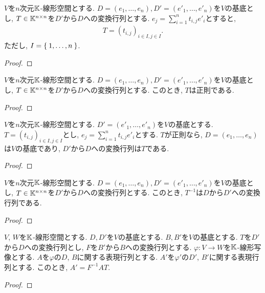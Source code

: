 \begin{prop}
  $V$を$n$次元$\mathbb{K}$-線形空間とする.
  $D=(e_1,\ldots, e_n),D'=(e'_1,\ldots, e'_n)$を$V$の基底とし,
  $T\in\mathbb{K}^{n\times n}$を$D'$から$D$への変換行列とする.
  $e_j=\sum_{i=1}^n t_{i,j}e'_i$とすると,
  \begin{align*}
    T=(t_{i,j})_{i\in I, j\in I}.
  \end{align*}
  ただし, $I=\Set{1,\ldots, n} $.
\end{prop}
\begin{proof}\end{proof}

\begin{prop}
  $V$を$n$次元$\mathbb{K}$-線形空間とする.
  $D=(e_1,\ldots, e_n),D'=(e'_1,\ldots, e'_n)$を$V$の基底とし,
  $T\in\mathbb{K}^{n\times n}$を$D'$から$D$への変換行列とする.
  このとき, $T$は正則である.
\end{prop}
\begin{proof}\end{proof}

\begin{prop}
  $V$を$n$次元$\mathbb{K}$-線形空間とする.
  $D'=(e'_1,\ldots, e'_n)$を$V$の基底とする.
  $T=(t_{i,j})_{i\in I, j\in I}$とし,
  $e_j=\sum_{i=1}^n t_{i,j}e'_i$とする.
  $T$が正則なら,
  $D=(e_1,\ldots, e_n)$は$V$の基底であり,
  $D'$から$D$への変換行列は$T$である.
\end{prop}
\begin{proof}\end{proof}


\begin{prop}
  $V$を$n$次元$\mathbb{K}$-線形空間とする.
  $D=(e_1,\ldots, e_n),D'=(e'_1,\ldots, e'_n)$を$V$の基底とし,
  $T\in\mathbb{K}^{n\times n}$を$D'$から$D$への変換行列とする.
  このとき, $T^{-1}$は$D$から$D'$への変換行列である.
\end{prop}
\begin{proof}\end{proof}



\begin{prop}
  $V$, $W$を$\mathbb{K}$-線形空間とする.
  $D, D'$を$V$の基底とする.
  $B, B'$を$V$の基底とする.
  $T$を$D'$から$D$への変換行列とし,
  $F$を$B'$から$B$への変換行列とする.
  $\varphi\colon V\to W$を$\mathbb{K}$-線形写像とする.
  $A$を$\varphi$の$D$, $B$に関する表現行列とする.
  $A'$を$\varphi'$の$D'$, $B'$に関する表現行列とする.
  このとき,
  $A'=F^{-1}AT$.
\end{prop}
\begin{proof}\end{proof}

